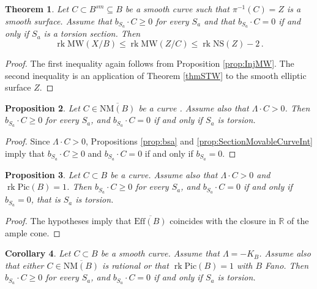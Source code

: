 \documentclass[11pt]{amsart}
\newtheorem{theorem}{Theorem}[section]
\newtheorem{proposition}[theorem]{Proposition}
\newtheorem{corollary}[theorem]{Corollary}
\theoremstyle{definition}
\theoremstyle{definition}
\theoremstyle{remark}
\theoremstyle{remark}
\theoremstyle{definition}
\theoremstyle{conjecture}
\newcommand{\NS}{\mathrm{NS}}
\newcommand{\MW}{\mathrm{MW}}
\newcommand{\Pic}{\mathrm{Pic}}
\begin{document}
\begin{theorem}\label{thm:InjMWsmooth}
Let $C \subset B^{sm} \subseteq B$ be a smooth curve such that $\pi^{-1}(C)=Z$ is a smooth surface. Assume  that $b_{S_a} \cdot C \geq 0$ for every $S_a$ and
that $b_{S_a} \cdot C = 0$ if and only if ${S_a}$ is a torsion section. Then
\[ 
\operatorname{rk} \MW(X/B) \leq \operatorname{rk} \MW(Z/C)   \leq \operatorname{rk} \NS(Z) - 2  \,.
\]
\end{theorem}
\begin{proof} The first inequality again follows from  Proposition \ref{prop:InjMW}. The second inequality is an application of Theorem \ref{thmSTW} to the  smooth elliptic surface $Z$.
\end{proof}




\begin{proposition}\label{prop-positiveintMov} Let $C\in \overline{\mathrm{NM}(B)}$ be a %
curve%
.
Assume also that $\Lambda \cdot C > 0$.  Then 
$b_{S_a} \cdot C \geq 0$ for every $S_a$, and
$b_{S_a} \cdot C = 0$ if and only if %
$S_a$ is torsion.

\end{proposition}

\begin{proof}  Since $\Lambda \cdot C > 0$, Propositions \ref{prop:bsa}  and \ref{prop:SectionMovableCurveInt} imply that $b_{S_a} \cdot C \geq 0$ and $b_{S_a} \cdot C = 0$ if and only if $b_{S_a}=0$. \end{proof}


\begin{proposition}\label{prop-positiveintPic1}  Let  $C \subset B$  be a %
curve.
 Assume also that $\Lambda \cdot C > 0$ and $\operatorname{rk} \Pic (B)=1$.  Then $b_{S_a} \cdot C \geq 0$ for every $S_a$, and
$b_{S_a} \cdot C = 0$ if and only if $b_{S_a}=0$, that is $S_a$ is torsion. 
\end{proposition}
\begin{proof} The hypotheses imply that $\overline{\mathrm{Eff}(B)}$ coincides with the closure  in $\mathbb{R}$ of the ample cone.
    \end{proof}




\begin{corollary}\label{cor:bsaNonNegMovANDPic1}  Let  $C  \subset  B$  be a smooth curve. Assume that 
$\Lambda = - K_B$. Assume also that either $C \in \overline{\mathrm{NM}(B)}$ is  rational or that  $\operatorname{rk} \Pic (B)=1 $  with $B$ Fano.
Then $b_{S_a} \cdot C \geq 0$ for every $S_a$, and
$b_{S_a} \cdot C = 0$ if and only if $S_a$ is torsion.
\end{corollary}
\end{document}
